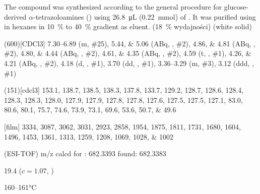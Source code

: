 The compound was synthesized according to the general procedure for glucose-derived $\alpha$-tetrazoloamines () using \SI{26.8}{\micro\liter} (\SI{0.22}{\milli\mol}) of .
It was purified using  in hexanes in \SI{10}{\percent} to \SI{40}{\percent} gradient as eluent.
(\SI{18}{\percent} wydajności) (white solid)
\begin{fullexp}
	\NMR(600)[CDCl3] \numrange{7.30}{6.89} (m, \#{25}), \numlist{5.44;5.06} (ABq, , \#{2}), \numlist{4.86;4.81} (ABq, , \#{2}), \numlist{4.80;4.44} (ABq, , \#{2}), \numlist{4.61;4.35} (ABq, , \#{2}), \num{4.59} (t, , \#{1}), \numlist{4.26;4.21} (ABq, , \#{2}), \num{4.18} (d, , \#{1}), \num{3.70} (dd, , \#{1}), \numrange{3.36}{3.29} (m, \#{3}), \num{3.12} (ddd, , \#{1})\par\noindent
	(151)[cdcl3] \numlist{153.1; 138.7; 138.5; 138.3; 137.8; 133.7; 129.2; 128.7; 128.6; 128.4; 128.3; 128.3; 128.0; 127.9; 127.9; 127.8; 127.8; 127.6; 127.5; 127.5; 127.1; 83.0; 80.6; 80.1; 75.7; 74.6; 73.9; 73.1; 69.6; 53.6; 50.7; 49.6}\par\noindent
	[film] \numlist{3334; 3087; 3062; 3031; 2923; 2858; 1954; 1875; 1811; 1731; 1680; 1604; 1496; 1453; 1361; 1313; 1259; 1208; 1069; 1028; 1002}\par\noindent
	 (ESI-TOF) m/z calcd for : \num{682.3393} found: \num{682.3383}\par\noindent
	\data{[$\alpha^{23}_D$]~$=$} \num{19.4} ($c = 1.07$, )\par\noindent
	 \numrange{160}{161}\si{\celsius}
\end{fullexp}

